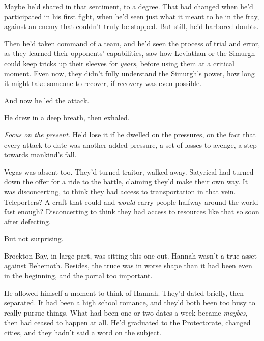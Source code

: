 Maybe he'd shared in that sentiment, to a degree.  That had changed when he'd participated in his first fight, when he'd seen just what it meant to be in the fray, against an enemy that couldn't truly be stopped.  But still, he'd harbored doubts.



Then he'd taken command of a team, and he'd seen the process of trial and error, as they learned their opponents' capabilities, saw how Leviathan or the Simurgh could keep tricks up their sleeves for \emph{years}, before using them at a critical moment.  Even now, they didn't fully understand the Simurgh's power, how long it might take someone to recover, if recovery was even possible.



And now he led the attack.



He drew in a deep breath, then exhaled.



\emph{Focus on the present}.  He'd lose it if he dwelled on the pressures, on the fact that every attack to date was another added pressure, a set of losses to avenge, a step towards mankind's fall.



Vegas was absent too.  They'd turned traitor, walked away.  Satyrical had turned down the offer for a ride to the battle, claiming they'd make their own way.  It was disconcerting, to think they had access to transportation in that vein.  Teleporters?  A craft that could and \emph{would} carry people halfway around the world fast enough?  Disconcerting to think they had access to resources like that so soon after defecting.



But not surprising.



Brockton Bay, in large part, was sitting this one out.  Hannah wasn't a true asset against Behemoth.  Besides, the truce was in worse shape than it had been even in the beginning, and the portal too important.



He allowed himself a moment to think of Hannah.  They'd dated briefly, then separated.  It had been a high school romance, and they'd both been too busy to really pursue things.  What had been one or two dates a week became \emph{maybes}, then had ceased to happen at all.  He'd graduated to the Protectorate, changed cities, and they hadn't said a word on the subject.




